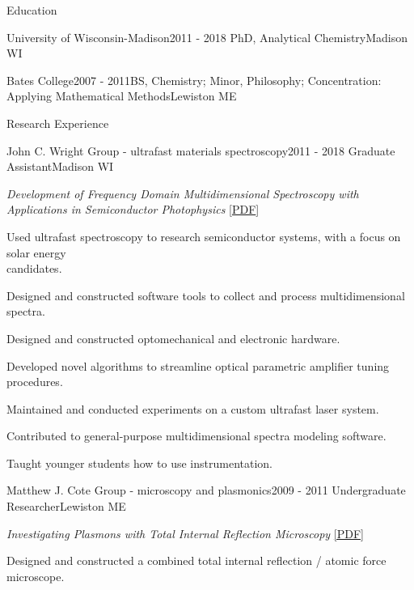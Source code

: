 \documentclass{resume}  %
\begin{document}
\begin{rSection}{Education}
  \begin{rSubsection}{University of Wisconsin-Madison}{2011 - 2018}
    {PhD, Analytical Chemistry}{Madison WI}
  \end{rSubsection}
  \begin{rSubsection}{Bates College}{2007 - 2011}{BS, Chemistry; Minor, Philosophy; Concentration:
      Applying Mathematical Methods}{Lewiston ME}
  \end{rSubsection}
\end{rSection}

\begin{rSection}{Research Experience}
  \begin{rSubsection}{John C. Wright Group - ultrafast materials spectroscopy}{2011 - 2018}
    {Graduate Assistant}{Madison WI}
    \item \emph{Development of Frequency Domain Multidimensional Spectroscopy with \\
    Applications in Semiconductor Photophysics}
    [\href{https://drive.google.com/open?id=1Ik2aaVaT-60R2KSATaFOlG5qDiR_xRze}{PDF}]
    \item Used ultrafast spectroscopy to research semiconductor systems, with a focus on solar
      energy \\ candidates.
    \item Designed and constructed software tools to collect and process multidimensional spectra.
    \item Designed and constructed optomechanical and electronic hardware.
    \item Developed novel algorithms to streamline optical parametric amplifier tuning procedures.
    \item Maintained and conducted experiments on a custom ultrafast laser system.
    \item Contributed to general-purpose multidimensional spectra modeling software.
    \item Taught younger students how to use instrumentation.
  \end{rSubsection}
  \begin{rSubsection}{Matthew J. Cote Group - microscopy and plasmonics}{2009 - 2011}
    {Undergraduate Researcher}{Lewiston ME}
    \item \emph{Investigating Plasmons with Total Internal Reflection Microscopy}
    \href{https://drive.google.com/open?id=1JdEK-6CLoGlacotAfR2IGDwonyUMM7uB}{[PDF]}
    \item Designed and constructed a combined total internal reflection / atomic force microscope.

\end{rSubsection}
\end{rSection}
\end{document}
